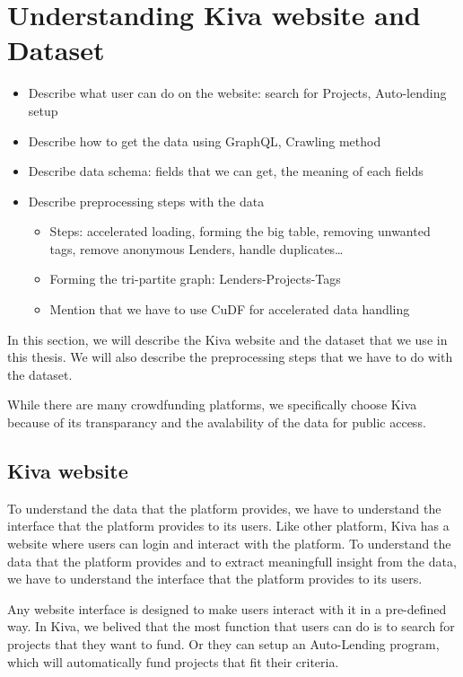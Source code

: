 \section{Understanding Kiva website and Dataset}

\begin{itemize}
	\item Describe what user can do on the website: search for Projects, Auto-lending setup
	\item Describe how to get the data using GraphQL, Crawling method
	\item Describe data schema: fields that we can get, the meaning of each fields
	\item Describe preprocessing steps with the data
	      \begin{itemize}
		      \item Steps: accelerated loading, forming the big table, removing unwanted tags, remove anonymous Lenders, handle duplicates\dots
		      \item Forming the tri-partite graph: Lenders-Projects-Tags
		      \item Mention that we have to use CuDF for accelerated data handling
	      \end{itemize}
\end{itemize}

In this section, we will describe the Kiva website and the dataset that we use in this thesis.
We will also describe the preprocessing steps that we have to do with the dataset.

While there are many crowdfunding platforms,
we specifically choose Kiva because of its transparancy and the avalability of the data for public access.

\subsection{Kiva website}

To understand the data that the platform provides, we have to understand the interface that the platform provides to its users.
Like other platform, Kiva has a website where users can login and interact with the platform.
To understand the data that the platform provides and to extract meaningfull insight from the data,
we have to understand the interface that the platform provides to its users.

Any website interface is designed to make users interact with it in a pre-defined way.
In Kiva, we belived that the most function that users can do is to search for projects that they want to fund.
Or they can setup an Auto-Lending program, which will automatically fund projects that fit their criteria.


